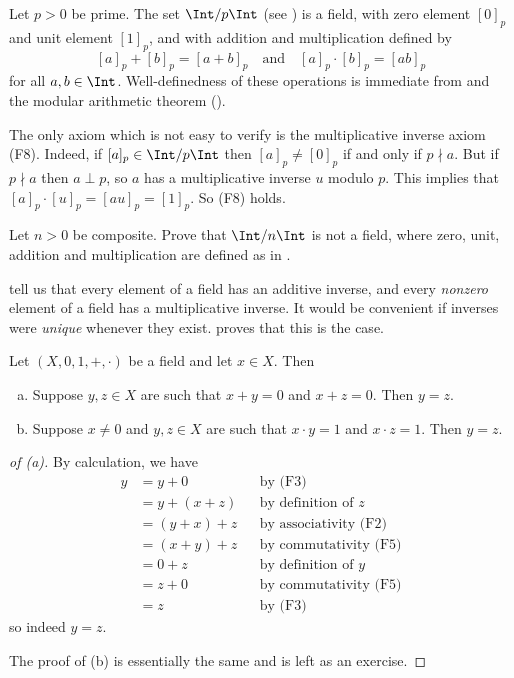 \begin{example}
\label{exZpZIsField}
Let $p>0$ be prime. The set $\Int/p\Int$ (see ) is a field, with zero element $[0]_p$ and unit element $[1]_p$, and with addition and multiplication defined by
\[ [a]_p+[b]_p=[a+b]_p \quad \text{and} \quad [a]_p \cdot [b]_p = [ab]_p \]
for all $a,b \in \Int$. Well-definedness of these operations is immediate from  and the modular arithmetic theorem ().

The only axiom which is not easy to verify is the multiplicative inverse axiom (F8). Indeed, if $[a]_p \in \Int/p\Int$ then $[a]_p \ne [0]_p$ if and only if $p \nmid a$. But if $p \nmid a$ then $a \perp p$, so $a$ has a multiplicative inverse $u$ modulo $p$. This implies that $[a]_p \cdot [u]_p = [au]_p = [1]_p$. So (F8) holds.
\end{example}

\begin{exercise}
Let $n > 0$ be composite. Prove that $\Int/n\Int$ is not a field, where zero, unit, addition and multiplication are defined as in .
\end{exercise}

 tell us that every element of a field has an additive inverse, and every \textit{nonzero} element of a field has a multiplicative inverse. It would be convenient if inverses were \textit{unique} whenever they exist.  proves that this is the case.

\begin{proposition}
\label{propInversesInFieldsAreUnique}
Let $(X,0,1,+,{\cdot})$ be a field and let $x \in X$. Then
\begin{enumerate}[(a)]
\item Suppose $y,z \in X$ are such that $x+y=0$ and $x+z=0$. Then $y=z$.
\item Suppose $x \ne 0$ and $y,z \in X$ are such that $x \cdot y = 1$ and $x \cdot z = 1$. Then $y=z$.
\end{enumerate}
\end{proposition}
\begin{proof}[of (a)]
By calculation, we have
\begin{align*}
y &= y + 0 && \text{by (F3)} \\
&= y + (x+z) && \text{by definition of $z$} \\
&= (y+x)+z && \text{by associativity (F2)} \\
&= (x+y)+z && \text{by commutativity (F5)} \\
&= 0+z && \text{by definition of $y$} \\
&= z+0 && \text{by commutativity (F5)} \\
&= z && \text{by (F3)}
\end{align*}
so indeed $y=z$.

The proof of (b) is essentially the same and is left as an exercise.
\end{proof}

